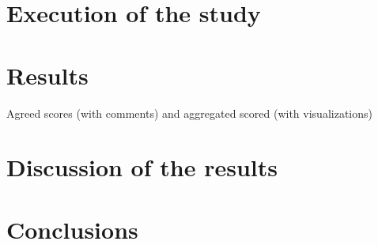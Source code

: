 \section{Execution of the study}

\section{Results}
Agreed scores (with comments) and aggregated scored (with visualizations)

\section{Discussion of the results}

\section{Conclusions}
